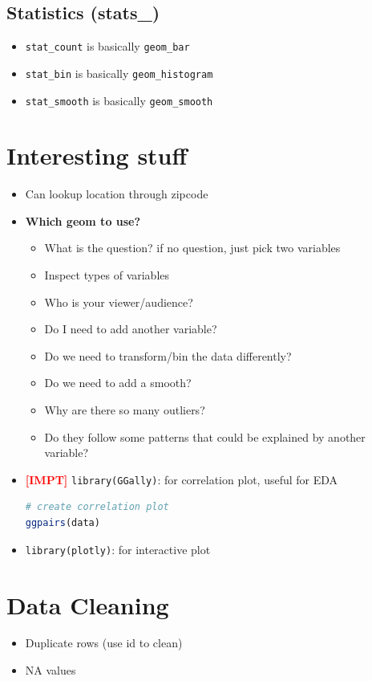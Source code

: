 \documentclass{article}
\newcommand{\impt}[0]{\textcolor{red}{\textbf{[IMPT] }}}
\begin{document}
\begin{multicols}{2}
\subsection{Statistics (stats\_)}
\begin{itemize}
	\item \texttt{stat\_count} is basically \texttt{geom\_bar}
	\item \texttt{stat\_bin} is basically \texttt{geom\_histogram}
	\item \texttt{stat\_smooth} is basically \texttt{geom\_smooth}
\end{itemize}

\section{Interesting stuff}
\begin{itemize}
	\item Can lookup location through zipcode
	\item \textbf{Which geom to use?}
	\begin{itemize}
		\item What is the question? if no question, just pick two variables
		\item Inspect types of variables
		\item Who is your viewer/audience?
		\item Do I need to add another variable?
		\item Do we need to transform/bin the data differently?
		\item Do we need to add a smooth?
		\item Why are there so many outliers?
		\item Do they follow some patterns that could be explained by another variable?
	\end{itemize}
    \item \impt \texttt{library(GGally)}: for correlation plot, useful for EDA
    \begin{lstlisting}[language=R]
# create correlation plot
ggpairs(data)
\end{lstlisting}
    \item \texttt{library(plotly)}: for interactive plot
\end{itemize}

\section{Data Cleaning}
\begin{itemize}
	\item Duplicate rows (use id to clean)
	\item NA values
\end{itemize}
\end{multicols}
\end{document}
